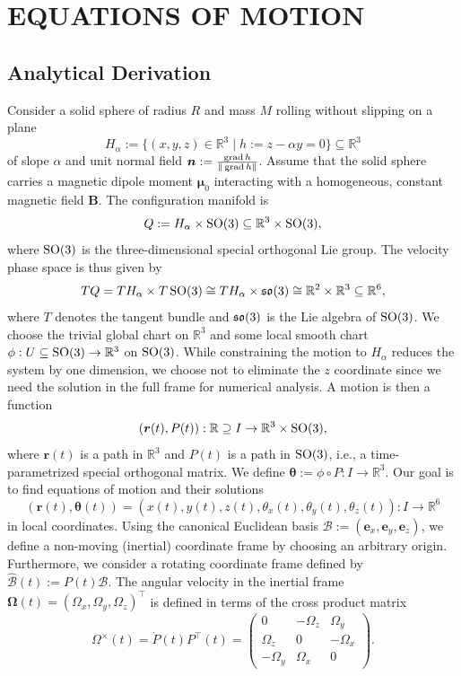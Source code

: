\section{EQUATIONS OF MOTION}
\label{sec:theoretic}
\subsection{Analytical Derivation}
Consider a solid sphere of radius $R$ and mass $M$ rolling without slipping on a plane
\begin{equation}
    \label{eq:hypersurface}
    H_\alpha := \{ (x,y,z) \in \mathbb{R}^3 \mid h:=z-\alpha y =0 \}\subseteq \mathbb{R}^3
\end{equation}
of slope $\alpha$ and unit normal field $\bm{n}:=\frac{\operatorname{grad} h}{\|\operatorname{grad} h\|}$.
Assume that the solid sphere carries a magnetic dipole moment $\bm{\mu}_0$ interacting with a homogeneous, constant magnetic field $\bm{B}$. The configuration manifold is \[
Q := H_\alpha \times \operatorname{SO}(3) \subseteq \mathbb{R}^3 \times \operatorname{SO}(3)
,\] where $\operatorname{SO}(3)$ is the three-dimensional special orthogonal Lie group. The velocity phase space is thus given by \[
TQ = TH_\alpha \times T\operatorname{SO}(3) \cong TH_\alpha \times \operatorname{\mathfrak{so}}(3) \cong \mathbb{R}^2 \times \mathbb{R}^3 \subseteq \mathbb{R}^6,
\] where $T$ denotes the tangent bundle and $\operatorname{\mathfrak{so}}(3)$ is the Lie algebra of $\operatorname{SO}(3)$. We choose the trivial global chart on $\mathbb{R}^3$ and some local smooth chart $\phi: U \subseteq \operatorname{SO}(3) \to \mathbb{R}^3$ on $\operatorname{SO}(3)$. While constraining the motion to $H_\alpha$ reduces the system by one dimension, we choose not to eliminate the $z$ coordinate since we need the solution in the full frame for numerical analysis. A motion is then a function \[
(\bm{r}(t), P(t)): \mathbb{R} \supseteq I \to \mathbb{R}^3 \times \operatorname{SO}(3),
\] where $\bm{r}(t)$ is a path in $\mathbb{R}^3$ and $P(t)$ is a path in $\operatorname{SO}(3)$, i.e., a time-parametrized special orthogonal matrix. We define $\bm{\theta}:= \phi \circ P: I \to \mathbb{R}^3$. Our goal is to find equations of motion and their solutions \[
(\bm{r}(t),\bm{\theta}(t))=(x(t),y(t),z(t),\theta_x(t),\theta_y(t),\theta_z(t)): I \to \mathbb{R}^6
\] in local coordinates. Using the canonical Euclidean basis $\mathcal{B}:=(\bm{e}_x,\bm{e}_y, \bm{e}_z)$, we define a non-moving (inertial) coordinate frame by choosing an arbitrary origin. Furthermore, we consider a rotating coordinate frame defined by $\hat{\mathcal{B}}(t):=P(t)\mathcal{B}$. The angular velocity in the inertial frame $\bm{\Omega}(t)=(\Omega_x, \Omega_y, \Omega_z)^\top$ is defined in terms of the cross product matrix $$\Omega^\times(t) = \dot{P}(t)P^\top(t) = 
\begin{pmatrix}
    0 & -\Omega_z & \Omega_y \\
    \Omega_z & 0 & -\Omega_x \\
    -\Omega_y & \Omega_x & 0
\end{pmatrix}
.$$ 
